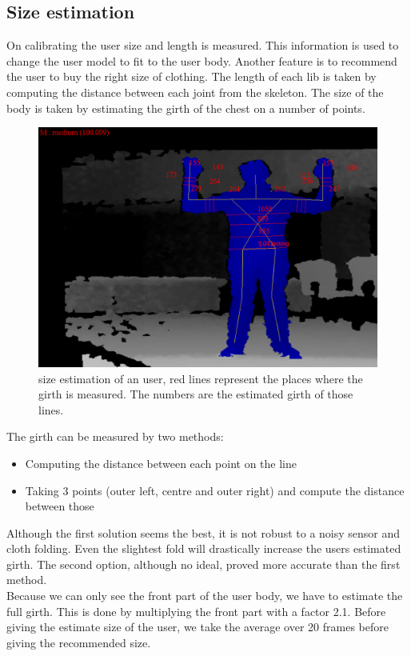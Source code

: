 \documentclass[a4paper]{article}
\begin{document}
\subsection{Size estimation}
On calibrating the user size and length is measured. This information is used to change the user model to fit to the user body. Another feature is to recommend the user to buy the right size of clothing. The length of each lib is taken by computing the distance between each joint from the skeleton.
The size of the body is taken by estimating the girth of the chest on a number of points.
\begin{figure}[htp]
\centering
\includegraphics[scale=0.3]{size_estimation.png} 
\caption{size estimation of an user, red lines represent the places where the girth is measured. The numbers are the estimated girth of those lines.}
\label{fig:size_estimation}
\end{figure}
The girth can be measured by two methods:
\begin{itemize}
\item Computing the distance between each point on the line
\item Taking 3 points (outer left, centre and outer right) and compute the distance between those
\end{itemize}
Although the first solution seems the best, it is not robust to a noisy sensor and cloth folding. Even the slightest fold will drastically increase the users estimated girth.
The second option, although no ideal, proved more accurate than the first method.
\\
Because we can only see the front part of the user body, we have to estimate the full girth. This is done by multiplying the front part with a factor 2.1.
Before giving the estimate size of the user, we take the average over 20 frames before giving the recommended size.
\end{document}
